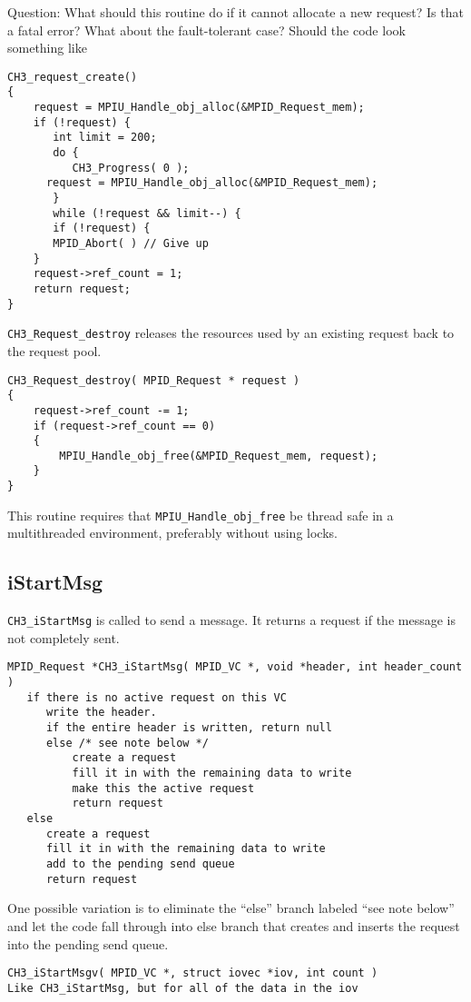 \documentclass{article}
\def\code{\begingroup\makeustext\eatcode}
\def\eatcode#1{\texttt{#1}\endgroup}
\begin{document}
Question: What should this routine do if it cannot allocate a new
request?  Is that a fatal error?  What about the fault-tolerant case?
Should the code look something like
\begin{verbatim}
CH3_request_create()
{
    request = MPIU_Handle_obj_alloc(&MPID_Request_mem);
    if (!request) {
       int limit = 200;
       do { 
          CH3_Progress( 0 );
	  request = MPIU_Handle_obj_alloc(&MPID_Request_mem);
       }
       while (!request && limit--) {
       if (!request) { 
	   MPID_Abort( ) // Give up
    }
    request->ref_count = 1;
    return request;
}    
\end{verbatim}

\code{CH3_Request_destroy} releases the resources used by an existing request
back to the request pool.  
\begin{verbatim}
CH3_Request_destroy( MPID_Request * request ) 
{
    request->ref_count -= 1;
    if (request->ref_count == 0)
    { 
        MPIU_Handle_obj_free(&MPID_Request_mem, request);
    }
}
\end{verbatim}
This routine requires that \code{MPIU_Handle_obj_free} be thread safe in a
multithreaded environment, preferably without using locks.

\subsection{iStartMsg}
\code{CH3_iStartMsg} is called to send a message.  It returns a
request if the message is 
not completely sent.

\begin{verbatim}
MPID_Request *CH3_iStartMsg( MPID_VC *, void *header, int header_count )
   if there is no active request on this VC
      write the header.
      if the entire header is written, return null
      else /* see note below */
          create a request
          fill it in with the remaining data to write
          make this the active request
          return request               
   else
      create a request
      fill it in with the remaining data to write
      add to the pending send queue
      return request
\end{verbatim}
One possible variation is to eliminate the ``else'' branch labeled ``see note
below'' and let the code fall through into else branch that creates and
inserts the request into the pending send queue.

\begin{verbatim}
CH3_iStartMsgv( MPID_VC *, struct iovec *iov, int count )
Like CH3_iStartMsg, but for all of the data in the iov
\end{verbatim}
\end{document}
